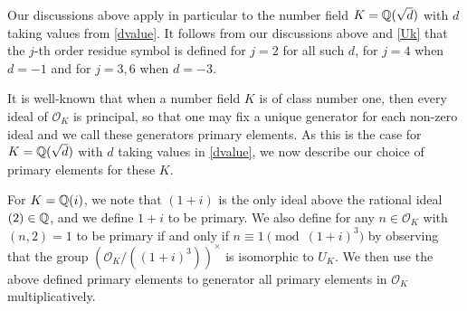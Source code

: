 \documentclass[twoside,leqno,10pt, A4]{amsart}
\begin{document}
Our discussions above apply in particular to the number field $K=\mathbb Q(\sqrt{d})$ with $d$ taking values from \eqref{dvalue}. It follows from our discussions above and \eqref{Uk} that the $j$-th order residue symbol is defined for $j=2$ for all such $d$, for $j=4$ when $d=-1$ and for $j=3, 6$ when $d=-3$. \newline

   It is well-known that when a number field $K$ is of class number one, then every ideal of $\mathcal O_K$ is principal, so that one may fix
a unique generator for each non-zero ideal and we call these generators primary elements. As this is the case for $K=\mathbb Q(\sqrt{d})$ with $d$ taking values in \eqref{dvalue}, we now describe our choice of primary elements for these $K$. \newline

  For $K=\mathbb Q(i)$, we note that $(1+i)$ is the only ideal above the rational ideal $(2) \in \mathbb Q$, and we define $1+i$ to be primary. We also define for any $n \in \mathcal O_K$ with $(n, 2)=1$ to be primary if and only if $n \equiv 1 \pmod {(1+i)^3}$ by observing that the group $\left (\mathcal{O}_K / ((1+i)^3) \right )^{\times}$ is isomorphic to $U_K$.  We then use the above defined primary elements to generator all primary elements in $\mathcal O_K$ multiplicatively. \newline
\end{document}
